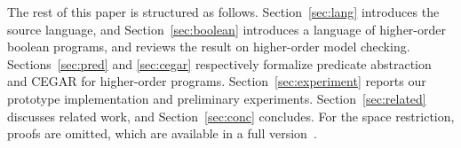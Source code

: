 The rest of this paper is structured as follows. Section~\ref{sec:lang} 
introduces the source language, and Section~\ref{sec:boolean} introduces 
a language of higher-order boolean programs, and reviews the result on 
higher-order model checking.
Sections~\ref{sec:pred} and \ref{sec:cegar} respectively formalize 
predicate abstraction and CEGAR for higher-order programs. 
Section~\ref{sec:experiment} reports our prototype implementation and 
preliminary experiments. Section~\ref{sec:related} discusses related 
work, and Section~\ref{sec:conc} concludes.
\iffull
\else
For the space restriction, proofs are omitted, which are available in a 
full version~\cite{Kobayashi2011}.
\fi

